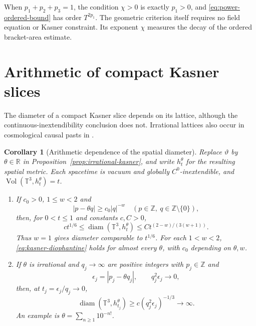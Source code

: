 \documentclass[10pt,a4paper]{article}
\numberwithin{equation}{section}
\newtheorem{corollary}[theorem]{Corollary}
\theoremstyle{definition}
\theoremstyle{remark}
\newcommand{\R}{\mathbb R}
\newcommand{\diam}{\operatorname{diam}}
\newcommand{\Vol}{\operatorname{Vol}}
\begin{document}
When $p_1+p_2+p_3=1$, the condition $\chi>0$ is exactly $p_1>0$,
and \eqref{eq:power-ordered-bound} has order $T^{2p_1}$.
The geometric criterion itself requires no field equation or Kasner
constraint.  Its exponent $\chi$ measures the decay of the ordered
bracket-area estimate.


\section{Arithmetic of compact Kasner slices}
\label{app:kasner-arithmetic}

The diameter of a compact Kasner slice depends on its lattice, although
the continuous-inextendibility conclusion does not.  Irrational lattices
also occur in cosmological causal pasts in \cite[Example~7(d)]{Lott2020}.

\begin{corollary}[Arithmetic dependence of the spatial diameter]
\label{cor:arithmetic-kasner}
Replace $\vartheta$ by $\theta\in\R$ in
Proposition~\ref{prop:irrational-kasner}, and write $h_t^\theta$ for
the resulting spatial metric.  Each spacetime is vacuum and globally
$C^0$-inextendible, and $\Vol(\mathbb T^3,h_t^\theta)=t$.
\begin{enumerate}[label=\textup{(\alph*)}]
\item If $c_0>0$, $1\le w<2$ and
\begin{equation}
 |p-\theta q|\ge c_0|q|^{-w}
 \quad(p\in\mathbb Z,\ q\in\mathbb Z\setminus\{0\}),
 \label{eq:kasner-diophantine}
\end{equation}
then, for $0<t\le1$ and constants $c,C>0$,
\begin{equation}
 c t^{1/6}\le\diam(\mathbb T^3,h_t^\theta)
 \le C t^{(2-w)/(3(w+1))}.
 \label{eq:kasner-diophantine-diameter}
\end{equation}
Thus $w=1$ gives diameter comparable to $t^{1/6}$.
For each $1<w<2$, \eqref{eq:kasner-diophantine} holds for almost
every $\theta$, with $c_0$ depending on $\theta,w$.
\item If $\theta$ is irrational and $q_j\to\infty$ are positive
integers with $p_j\in\mathbb Z$ and
\begin{equation}
 \epsilon_j=|p_j-\theta q_j|,\qquad q_j^2\epsilon_j\longrightarrow0,
 \label{eq:kasner-liouville}
\end{equation}
then, at $t_j=\epsilon_j/q_j\to0$,
\begin{equation}
 \diam(\mathbb T^3,h_{t_j}^\theta)
 \ge c(q_j^2\epsilon_j)^{-1/3}\longrightarrow\infty.
 \label{eq:kasner-liouville-diameter}
\end{equation}
An example is $\theta=\sum_{n\ge1}10^{-n!}$.
\end{enumerate}
\end{corollary}
\end{document}
